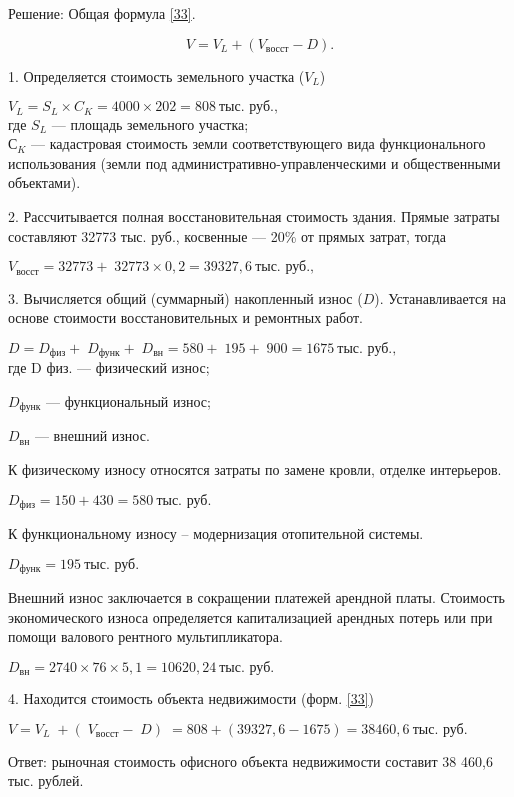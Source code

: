 Решение: Общая формула \ref{33}.

\begin{equation}\label{33}
V = V_L + (V_\text{восст} - D).
\end{equation}

1. Определяется стоимость земельного участка ($V_L$)

$ V_L = S_L \times C_K = 4000 \times 202 = 808\ \text{тыс. руб.}, $\\
где $ S_L $ --- площадь земельного участка;\\
$ С_K $ --- кадастровая стоимость земли соответствующего вида функционального использования (земли под административно-управленческими и общественными объектами).

2. Рассчитывается полная восстановительная стоимость здания.
Прямые затраты составляют 32773 тыс. руб., косвенные --- 20\% от прямых затрат, тогда

$ V_\text{восст} = 32773 + 32773 \times 0,2 = 39327,6\ \text{тыс. руб.}, $

3. Вычисляется общий (суммарный) накопленный износ ($ D $).
Устанавливается на основе стоимости восстановительных и ремонтных работ.

$ D = D_\text{физ} +  D_\text{функ} + D_\text{вн} = 580 + 195 + 900 = 1675\ \text{тыс. руб.}, $\\
где D физ. --- физический износ;

$ D_\text{функ} $ --- функциональный износ;

$ D_\text{вн} $ --- внешний износ.

К физическому износу относятся затраты по замене кровли, отделке интерьеров.

$ D_\text{физ} = 150 + 430 = 580\ \text{тыс. руб.} $

К функциональному износу – модернизация отопительной системы.

$ D_\text{функ} = 195\ \text{тыс. руб.} $

Внешний износ заключается в сокращении платежей арендной платы.
Стоимость экономического износа определяется капитализацией арендных потерь или при помощи валового рентного мультипликатора.

$ D_ \text{вн} = 2740 \times 76 \times 5,1 = 10620,24\ \text{тыс. руб.} $

4. Находится стоимость объекта недвижимости (форм. \ref{33})

$ V = V_L + ( V_\text{восст} - D) = 808 +(39327,6 - 1675) = 38460,6\ \text{тыс. руб.} $

Ответ: рыночная стоимость офисного объекта недвижимости составит 38 460,6 тыс. рублей.











